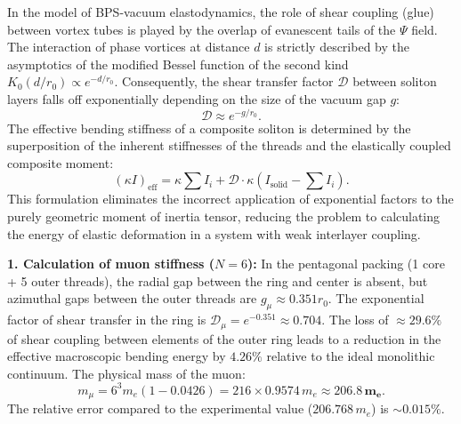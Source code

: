\documentclass[11pt,a4paper]{article}
\begin{document}
	In the model of BPS-vacuum elastodynamics, the role of shear coupling (glue) between vortex tubes is played by the overlap of evanescent tails of the $\Psi$ field. The interaction of phase vortices at distance $d$ is strictly described by the asymptotics of the modified Bessel function of the second kind $K_0(d/r_0) \propto e^{-d/r_0}$. Consequently, the shear transfer factor $\mathcal{D}$ between soliton layers falls off exponentially depending on the size of the vacuum gap $g$:
	\begin{equation}
		\mathcal{D} \approx e^{-g/r_0}.
	\end{equation}
	The effective bending stiffness of a composite soliton is determined by the superposition of the inherent stiffnesses of the threads and the elastically coupled composite moment:
	\begin{equation}
		(\kappa I)_{\text{eff}} = \kappa \sum I_i + \mathcal{D} \cdot \kappa \left( I_{\text{solid}} - \sum I_i \right).
	\end{equation}
	This formulation eliminates the incorrect application of exponential factors to the purely geometric moment of inertia tensor, reducing the problem to calculating the energy of elastic deformation in a system with weak interlayer coupling.
	
	\textbf{1. Calculation of muon stiffness ($N=6$):} 
	In the pentagonal packing (1 core + 5 outer threads), the radial gap between the ring and center is absent, but azimuthal gaps between the outer threads are $g_\mu \approx 0.351 r_0$. The exponential factor of shear transfer in the ring is $\mathcal{D}_\mu = e^{-0.351} \approx 0.704$.
	The loss of $\approx 29.6\%$ of shear coupling between elements of the outer ring leads to a reduction in the effective macroscopic bending energy by $4.26\%$ relative to the ideal monolithic continuum. The physical mass of the muon:
	\begin{equation}
		m_\mu = 6^3 m_e (1 - 0.0426) = 216 \times 0.9574 \, m_e \approx \mathbf{206.8 \, m_e}.
	\end{equation}
	The relative error compared to the experimental value ($206.768 \, m_e$) is $\sim 0.015\%$.
	
\end{document}
